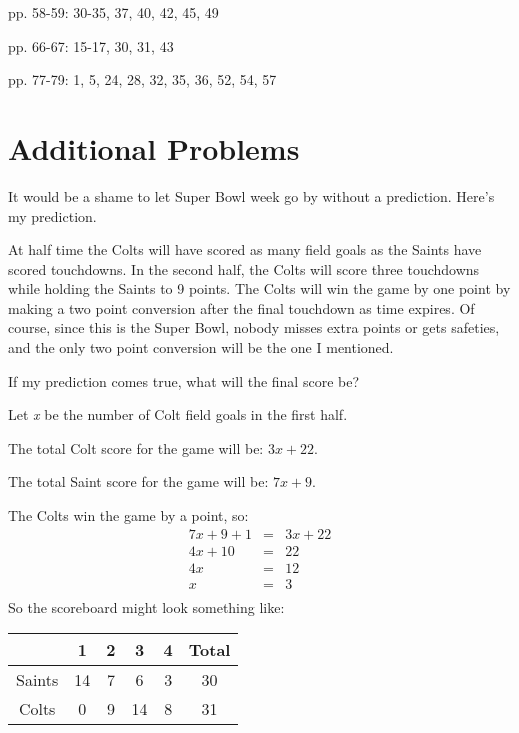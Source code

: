 \documentclass{exam}
\begin{document}
\else
\begin{itemize*}
\item pp. 58-59: 30-35, 37, 40, 42, 45, 49
\item pp. 66-67: 15-17, 30, 31, 43
\item pp. 77-79: 1, 5, 24, 28, 32, 35, 36, 52, 54, 57
\end{itemize*}

\fi

\section{Additional Problems}

\begin{questions}

\question
It would be a shame to let Super Bowl week go by without a prediction.  Here's my prediction.

At half time the Colts will have scored as many field goals as the Saints have scored touchdowns.  In the second half,
the Colts will score three touchdowns while holding the Saints to 9 points.  The Colts will win the game by one point by
making a two point conversion after the final touchdown as time expires.  Of course, since this is the Super Bowl, nobody
misses extra points or gets safeties, and the only two point conversion will be the one I mentioned.

If my prediction comes true, what will the final score be?

\begin{solution}
Let {\em x} be the number of Colt field goals in the first half.

The total Colt score for the game will be: \(3x + 22\).

The total Saint score for the game will be: \(7x + 9\).

The Colts win the game by a point, so:
\begin{eqnarray*}
  7x + 9 + 1 & = & 3x + 22 \\
  4x + 10 & = & 22 \\
  4x & = & 12 \\
  x  & = & 3 \\
\end{eqnarray*}
So the scoreboard might look something like:

\begin{tabular}{|c|c|c|c|c|c|}
\hline
           & 1  & 2 & 3 & 4 & Total \\
\hline
  Saints   & 14 & 7 & 6 & 3 & 30 \\
\hline
  Colts    & 0  & 9 & 14 & 8 & 31 \\
\hline
\end{tabular}


\end{solution}
\end{questions}
\end{document}
